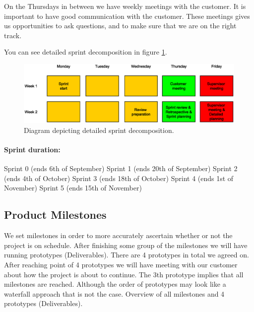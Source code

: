 On the Thursdays in between we have weekly meetings with the customer. It is important to have good communication with the customer. These meetings gives us opportunities to ask questions, and to make sure that we are on the right track.

You can see detailed sprint decomposition in figure \ref{img:sprint_detail}.

\begin{figure}[!ht]
    \begin{center}
    \includegraphics[scale=0.5]{images/sprint_detail.eps}
    \caption{Diagram depicting detailed sprint decomposition.}
    \label{img:sprint_detail}
    \end{center}
\end{figure}

\paragraph{Sprint duration:}
Sprint 0 (ends 6th of September)
Sprint 1 (ends 20th of September)
Sprint 2 (ends 4th of October)
Sprint 3 (ends 18th of October)
Sprint 4 (ends 1st of November)
Sprint 5 (ends 15th of November)


\subsection{Product Milestones}

We set milestones in order to more accurately ascertain whether or not the project is on schedule. After finishing some group of the milestones we will have running prototypes (Deliverables). There are 4 prototypes in total we 
agreed on. After reaching point of 4 prototypes we will have meeting with our customer about how the project is about to continue. The 3th prototype implies that all milestones are reached. 
Although the order of prototypes may look like a waterfall approach that is not the case.
Overview of all milestones and 4 prototypes (Deliverables).

